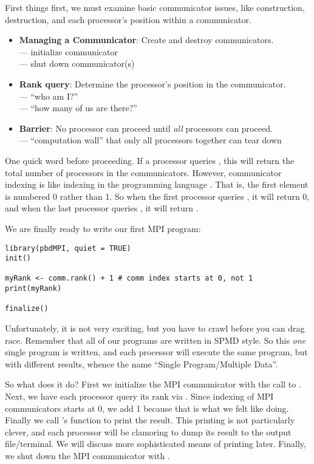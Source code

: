 First things first, we must examine basic communicator issues, like construction, destruction, and each processor's position within a communicator.

\begin{itemize}
  \item \textbf{Managing a Communicator}:  Create and destroy communicators.\\
   --- initialize communicator\\
   --- shut down communicator(s)
  \item \textbf{Rank query}: Determine the processor's position in the communicator.\\
   --- ``who am I?''\\
   --- ``how many of us are there?''
  \item \textbf{Barrier}: No processor can proceed until \emph{all} processors can proceed.\\
   --- ``computation wall'' that only all processors together can tear down
\end{itemize}


One quick word before proceeding.  If a processor queries , this will return the total number of processors in the communicators.  However, communicator indexing is like indexing in the programming language .  That is, the first element is numbered 0 rather than 1.  So when the first processor queries , it will return 0, and when the last processor queries , it will return .
  
We are finally ready to write our first MPI program:

\begin{lstlisting}[language=rr,title=Simple pbdMPI Example 1]
library(pbdMPI, quiet = TRUE)
init()

myRank <- comm.rank() + 1 # comm index starts at 0, not 1
print(myRank)

finalize()
\end{lstlisting}

Unfortunately, it is not very exciting, but you have to crawl before you can drag race.  Remember that all of our programs are written in SPMD style.  So this \emph{one} single program is written, and each processor will execute the same program, but with different results, whence the name ``Single Program/Multiple Data''.  

So what does it do?  First we initialize the MPI communicator with the call to .  Next, we have each processor query its rank via .  Since indexing of MPI communicators starts at 0, we add 1 because that is what we felt like doing.  Finally we call 's  function to print the result.  This printing is not particularly clever, and each processor will be clamoring to dump its result to the output file/terminal.  We will discuss more sophisticated means of printing later.  Finally, we shut down the MPI communicator with .

